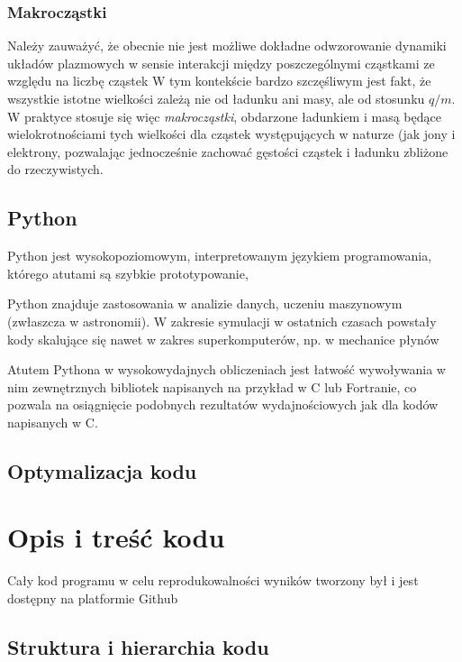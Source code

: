 \subsubsection{Makrocząstki}
Należy zauważyć, że obecnie nie jest możliwe dokładne odwzorowanie dynamiki układów plazmowych w sensie interakcji
między poszczególnymi cząstkami ze względu na liczbę cząstek %
W tym kontekście bardzo szczęśliwym jest fakt, że wszystkie istotne wielkości zależą nie od ładunku ani masy,
ale od stosunku $q/m$. W praktyce stosuje się więc \emph{makrocząstki}, obdarzone ładunkiem i masą będące wielokrotnościami
tych wielkości dla cząstek występujących w naturze (jak jony i elektrony, pozwalając jednocześnie zachować gęstości
cząstek i ładunku %
zbliżone do rzeczywistych.

\subsection{Python}
Python jest wysokopoziomowym, interpretowanym językiem programowania, którego atutami są szybkie prototypowanie,

Python znajduje zastosowania w analizie danych, uczeniu maszynowym (zwłaszcza w astronomii). W zakresie symulacji
w ostatnich czasach powstały kody skalujące się nawet w zakres superkomputerów, np. w mechanice płynów %

Atutem Pythona w wysokowydajnych obliczeniach jest łatwość wywoływania w nim zewnętrznych bibliotek napisanych
na przykład w C lub Fortranie, co pozwala na osiągnięcie podobnych rezultatów wydajnościowych jak dla kodów
napisanych w C.

\subsection{Optymalizacja kodu}

\section{Opis i treść kodu} %
Cały kod programu w celu reprodukowalności wyników tworzony był i jest dostępny na platformie Github %

\subsection{Struktura i hierarchia kodu}

